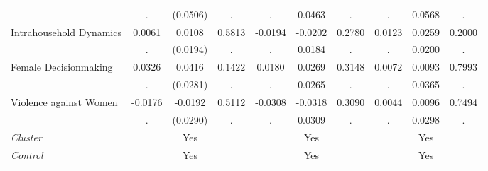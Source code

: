 \begin{tabular}{l*{9}{c}}
  & . & (0.0506) & . & . & 0.0463 & . & . & 0.0568 & . \\
Intrahousehold Dynamics & 0.0061 & 0.0108 & 0.5813 & -0.0194 & -0.0202 & 0.2780 & 0.0123 & 0.0259 & 0.2000 \\
  & . & (0.0194) & . & . & 0.0184 & . & . & 0.0200 & . \\
Female Decisionmaking & 0.0326 & 0.0416 & 0.1422 & 0.0180 & 0.0269 & 0.3148 & 0.0072 & 0.0093 & 0.7993 \\
  & . & (0.0281) & . & . & 0.0265 & . & . & 0.0365 & . \\
Violence against Women & -0.0176 & -0.0192 & 0.5112 & -0.0308 & -0.0318 & 0.3090 & 0.0044 & 0.0096 & 0.7494 \\
  & . & (0.0290) & . & . & 0.0309 & . & . & 0.0298 & . \\
\hline \textit{Cluster} & & Yes &  & & Yes &  & & Yes &  \\ \textit{Control} & & Yes &  & & Yes &  & & Yes &   \\ \hline \end{tabular}

